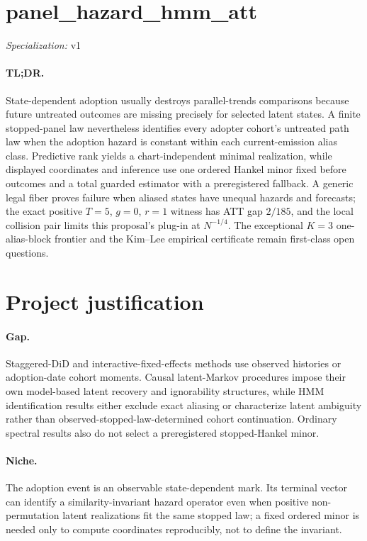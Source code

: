 \documentclass{article}
\begin{document}
\sloppy

\section*{panel\_\allowbreak{}hazard\_\allowbreak{}hmm\_\allowbreak{}att}

\noindent\textit{Specialization:} v1\par

\paragraph{TL;DR.} State-dependent adoption usually destroys parallel-trends comparisons because future untreated outcomes are missing precisely for selected latent states. A finite stopped-panel law nevertheless identifies every adopter cohort's untreated path law when the adoption hazard is constant within each current-emission alias class. Predictive rank yields a chart-independent minimal realization, while displayed coordinates and inference use one ordered Hankel minor fixed before outcomes and a total guarded estimator with a preregistered fallback. A generic legal fiber proves failure when aliased states have unequal hazards and forecasts; the exact positive \(T=5\), \(g=0\), \(r=1\) witness has ATT gap \(2/185\), and the local collision pair limits this proposal's plug-in at \(N^{-1/4}\). The exceptional \(K=3\) one-alias-block frontier and the Kim--Lee empirical certificate remain first-class open questions.

\section{Project justification}

\paragraph{Gap.} Staggered-DiD and interactive-fixed-effects methods use observed histories or adoption-date cohort moments. Causal latent-Markov procedures impose their own model-based latent recovery and ignorability structures, while HMM identification results either exclude exact aliasing or characterize latent ambiguity rather than observed-stopped-law-determined cohort continuation. Ordinary spectral results also do not select a preregistered stopped-Hankel minor.

\paragraph{Niche.} The adoption event is an observable state-dependent mark. Its terminal vector can identify a similarity-invariant hazard operator even when positive non-permutation latent realizations fit the same stopped law; a fixed ordered minor is needed only to compute coordinates reproducibly, not to define the invariant.
\end{document}
